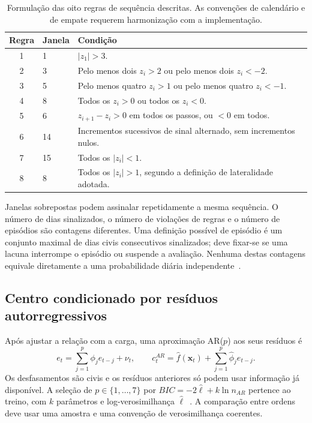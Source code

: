 \begin{table}[htbp]
\centering\small
\caption{Formulação das oito regras de sequência descritas. As convenções de calendário e de empate requerem harmonização com a implementação.}
\label{tab:mat-regras}
\begin{tabularx}{\linewidth}{@{}clX@{}}\toprule
Regra & Janela & Condição\\\midrule
1 & 1 & $|z_1|>3$.\\
2 & 3 & Pelo menos dois $z_i>2$ ou pelo menos dois $z_i<-2$.\\
3 & 5 & Pelo menos quatro $z_i>1$ ou pelo menos quatro $z_i<-1$.\\
4 & 8 & Todos os $z_i>0$ ou todos os $z_i<0$.\\
5 & 6 & $z_{i+1}-z_i>0$ em todos os passos, ou $<0$ em todos.\\
6 & 14 & Incrementos sucessivos de sinal alternado, sem incrementos nulos.\\
7 & 15 & Todos os $|z_i|<1$.\\
8 & 8 & Todos os $|z_i|>1$, segundo a definição de lateralidade adotada.\\\bottomrule
\end{tabularx}
\end{table}

Janelas sobrepostas podem assinalar repetidamente a mesma sequência. O número de dias sinalizados, o número de violações de regras e o número de episódios são contagens diferentes. Uma definição possível de episódio é um conjunto maximal de dias civis consecutivos sinalizados; deve fixar-se se uma lacuna interrompe o episódio ou suspende a avaliação. Nenhuma destas contagens equivale diretamente a uma probabilidade diária independente~\parencite{Nelson1984,Wardell1994}.


\subsection{Centro condicionado por resíduos autorregressivos}
\label{sec:mat-ar-bandas}
Após ajustar a relação com a carga, uma aproximação AR($p$) aos seus resíduos é
\begin{equation}
e_t=\sum_{j=1}^p\phi_je_{t-j}+\nu_t,
\qquad c_t^{AR}=\widehat f(\boldsymbol x_t)+\sum_{j=1}^p\widehat\phi_je_{t-j}.
\label{eq:mat-centro-ar}
\end{equation}
Os desfasamentos são civis e os resíduos anteriores só podem usar informação já disponível. A seleção de $p\in\{1,\ldots,7\}$ por $BIC=-2\widehat\ell+k\ln n_{AR}$ pertence ao treino, com $k$ parâmetros e log-verosimilhança $\widehat\ell$~\parencite{Schwarz1978}. A comparação entre ordens deve usar uma amostra e uma convenção de verosimilhança coerentes.

